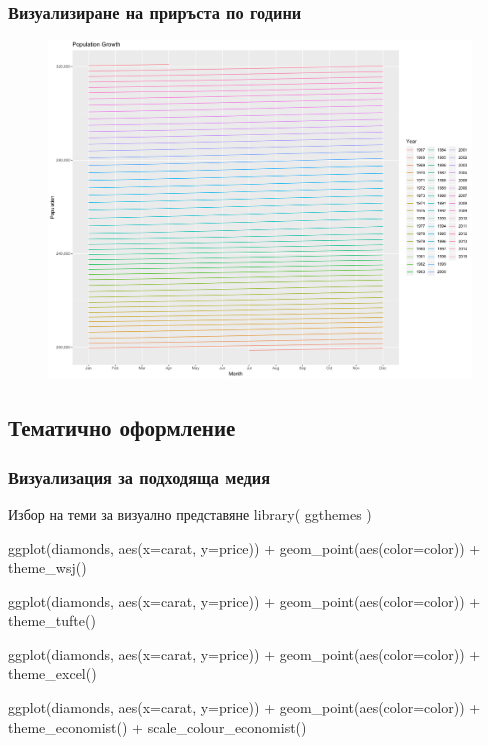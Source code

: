 \documentclass{beamer}
\begin{document}
\begin{frame}
\frametitle{Визуализиране на приръста по години}
\begin{figure}[]\includegraphics[width=\textwidth,height=0.75\textheight]{pic0042}\end{figure}
\end{frame}

\subsection{Тематично оформление}

\begin{frame}
\frametitle{Визуализация за подходяща медия}
\begin{block}{Избор на теми за визуално представяне}
library( ggthemes )

ggplot(diamonds, aes(x=carat, y=price)) + geom\_point(aes(color=color)) + theme\_wsj()

ggplot(diamonds, aes(x=carat, y=price)) + geom\_point(aes(color=color)) + theme\_tufte()

ggplot(diamonds, aes(x=carat, y=price)) + geom\_point(aes(color=color)) + theme\_excel()

ggplot(diamonds, aes(x=carat, y=price)) + geom\_point(aes(color=color)) +  theme\_economist() + scale\_colour\_economist()
\end{block}
\end{frame}
\end{document}
